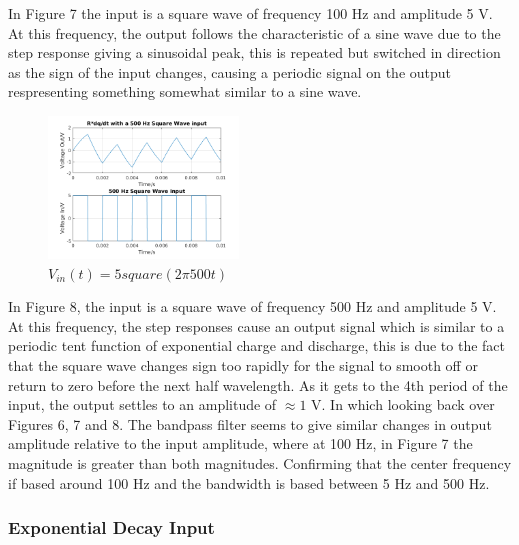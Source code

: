\documentclass[11pt,a4paper]{article}
\begin{document}
\vspace{5mm}In Figure 7 the input is a square wave of frequency 100 Hz and amplitude 5 V. At this frequency, the output follows the characteristic of a sine wave due to the step response giving a sinusoidal peak, this is repeated but switched in direction as the sign of the input changes, causing a periodic signal on the output respresenting something somewhat similar to a sine wave.

\begin{figure}
    \vspace{-5mm}
  		\includegraphics[width=0.45\textwidth]{Ex3_Figs/500Squ1.png}
	\vspace{-6mm}
  	\caption{$V_{in}(t)= 5square(2 \pi 500t)$}
  	\label{fig:ex3g7}
\end{figure}

\vspace{5mm}In Figure 8, the input is a square wave of frequency 500 Hz and amplitude 5 V. At this frequency, the step responses cause an output signal which is similar to a periodic tent function of exponential charge and discharge, this is due to the fact that the square wave changes sign too rapidly for the signal to smooth off or return to zero before the next half wavelength. As it gets to the 4th period of the input, the output settles to an amplitude of $\approx 1$ V. In which looking back over Figures 6, 7 and 8. The bandpass filter seems to give similar changes in output amplitude relative to the input amplitude, where at 100 Hz, in Figure 7 the magnitude is greater than both magnitudes. Confirming that the center frequency if based around 100 Hz and the bandwidth is based between 5 Hz and 500 Hz.

\subsubsection{Exponential Decay Input}
\end{document}
